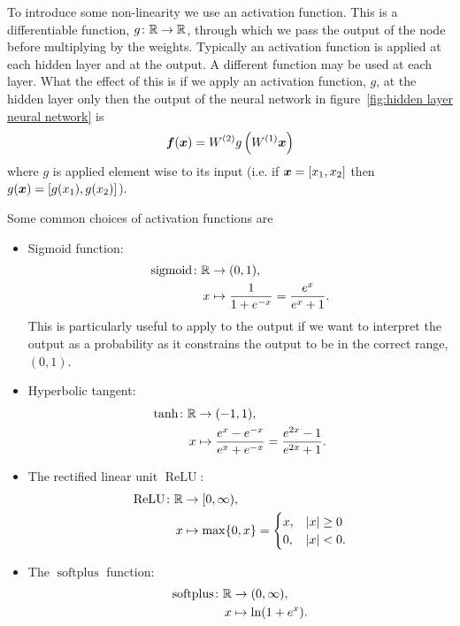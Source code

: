\documentclass[a4paper]{article}
\begin{document}
    To introduce some non-linearity we use an activation function.
    This is a differentiable function, \(g\colon\mathbb{R}\to\mathbb{R}\), through which we pass the output of the node before multiplying by the weights.
    Typically an activation function is applied at each hidden layer and at the output.
    A different function may be used at each layer.
    What the effect of this is if we apply an activation function, \(g\), at the hidden layer only then the output of the neural network in figure~\ref{fig:hidden layer neural network} is
    \[\bm{f}(\bm{x}) = W^{(2)}g\left(W^{(1)}\bm{x}\right)\]
    where \(g\) is applied element wise to its input (i.e. if \(\bm{x} = [x_1, x_2]\) then \(g(\bm{x}) = [g(x_1), g(x_2)]\)).
    
    Some common choices of activation functions are
    \begin{itemize}
        \item Sigmoid function:
        \begin{align*}
            \operatorname{sigmoid}\colon\mathbb{R}&\to(0, 1),\\
            x&\mapsto \frac{1}{1 + e^{-x}} = \frac{e^x}{e^x + 1}.
        \end{align*}
        This is particularly useful to apply to the output if we want to interpret the output as a probability as it constrains the output to be in the correct range, \((0, 1)\).
        \item Hyperbolic tangent:
        \begin{align*}
            \tanh\colon\mathbb{R}&\to(-1, 1),\\
            x&\mapsto\frac{e^x - e^{-x}}{e^x + e^{-x}} = \frac{e^{2x} - 1}{e^{2x} + 1}.
        \end{align*}
        \item The rectified linear unit \(\operatorname{ReLU}\):
        \begin{align*}
            \operatorname{ReLU}\colon\mathbb{R}&\to[0, \infty),\\
            x&\mapsto\max\{0, x\} =
            \begin{cases}
                x, & \abs{x} \ge 0\\
                0, & \abs{x} < 0.
            \end{cases}
        \end{align*}
        \item The \(\operatorname{softplus}\) function:
        \begin{align*}
            \operatorname{softplus}\colon\mathbb{R}&\to(0, \infty),\\
            x&\mapsto\ln(1 + e^x).
        \end{align*}
    \end{itemize}
\end{document}
